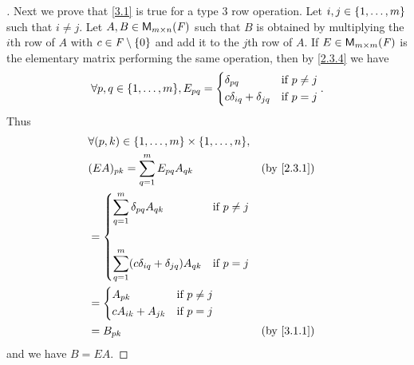 \begin{proof}[]
  Next we prove that \cref{3.1} is true for a type 3 row operation.
  Let \(i, j \in \left\lbrace1, \dots, m\right\rbrace\) such that \(i \neq j\).
  Let \(A, B \in \mathsf{M}_{{m} \times n}({\mathit{F}})\) such that \(B\) is obtained by multiplying the \(i\)th row of \(A\) with \(c \in \mathit{F} \setminus \left\lbrace0\right\rbrace\) and add it to the \(j\)th row of \(A\).
  If \(E \in \mathsf{M}_{{m} \times m}({\mathit{F}})\) is the elementary matrix performing the same operation, then by \cref{2.3.4} we have
  \[
    \forall p, q \in \set{1, \dots, m}, E_{p q} = \begin{dcases}
      \delta_{p q}                  & \text{if } p \neq j \\
      c \delta_{i q} + \delta_{j q} & \text{if } p = j
    \end{dcases}.
  \]
  Thus
  \begin{align*}
     & \forall (p, k) \in \set{1, \dots, m} \times \set{1, \dots, n},                                                                      \\
     & (EA)_{p k} = \sum_{q = 1}^m E_{p q} A_{q k}                                                           &  & \text{(by \cref{2.3.1})} \\
     & = \begin{dcases}
           \sum_{q = 1}^m \delta_{p q} A_{q k}                    & \text{if } p \neq j \\                    \\
           \sum_{q = 1}^m (c \delta_{i q} + \delta_{j q}) A_{q k} & \text{if } p = j
         \end{dcases}                                \\
     & = \begin{dcases}
           A_{p k}             & \text{if } p \neq j \\
           c A_{i k} + A_{j k} & \text{if } p = j
         \end{dcases}                                                                                         \\
     & = B_{p k}                                                                                             &  & \text{(by \cref{3.1.1})}
  \end{align*}
  and we have \(B = EA\).


\end{proof}
